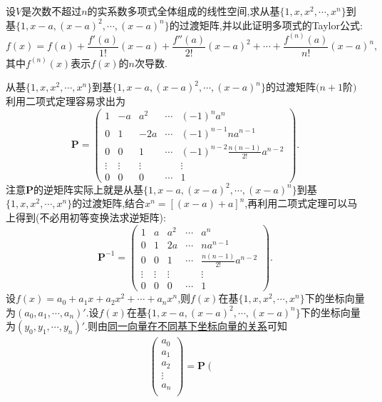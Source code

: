 \documentclass[lang=cn,newtx,10pt,scheme=chinese]{elegantbook}
\begin{document}
\begin{example}
设\(V\)是次数不超过\(n\)的实系数多项式全体组成的线性空间,求从基\(\{1,x,x^2,\cdots,x^n\}\)到基\(\{1,x - a,(x - a)^2,\cdots,(x - a)^n\}\)的过渡矩阵,并以此证明多项式的Taylor公式:
    \[
    f(x)=f(a)+\frac{f'(a)}{1!}(x - a)+\frac{f''(a)}{2!}(x - a)^2+\cdots+\frac{f^{(n)}(a)}{n!}(x - a)^n,
    \]
    其中\(f^{(n)}(x)\)表示\(f(x)\)的\(n\)次导数.
\end{example}
\begin{solution}
    从基\(\{1,x,x^2,\cdots,x^n\}\)到基\(\{1,x - a,(x - a)^2,\cdots,(x - a)^n\}\)的过渡矩阵\((n + 1\)阶\()\)利用二项式定理容易求出为
    \[
    \boldsymbol{P}=\begin{pmatrix}
    1&-a&a^2&\cdots&(-1)^na^n\\
    0&1&-2a&\cdots&(-1)^{n - 1}na^{n - 1}\\
    0&0&1&\cdots&(-1)^{n - 2}\frac{n(n - 1)}{2!}a^{n - 2}\\
    \vdots&\vdots&\vdots&&\vdots\\
    0&0&0&\cdots&1
    \end{pmatrix}.
    \]
    注意\(\boldsymbol{P}\)的逆矩阵实际上就是从基\(\{1,x - a,(x - a)^2,\cdots,(x - a)^n\}\)到基\(\{1,x,x^2,\cdots,x^n\}\)的过渡矩阵,结合$x^n=[(x-a)+a]^n$,再利用二项式定理可以马上得到(不必用初等变换法求逆矩阵):
    \[
    \boldsymbol{P}^{-1}=\begin{pmatrix}
    1&a&a^2&\cdots&a^n\\
    0&1&2a&\cdots&na^{n - 1}\\
    0&0&1&\cdots&\frac{n(n - 1)}{2!}a^{n - 2}\\
    \vdots&\vdots&\vdots&&\vdots\\
    0&0&0&\cdots&1
    \end{pmatrix}.
    \]
    设\(f(x)=a_0 + a_1x + a_2x^2+\cdots + a_nx^n\),则\(f(x)\)在基\(\{1,x ,x^2,\cdots,x^n\}\)下的坐标向量为$(a_0,a_1,\cdots,a_n)'$.设\(f(x)\)在基\(\{1,x - a,(x - a)^2,\cdots,(x - a)^n\}\)下的坐标向量为$(y_0,y_1,\cdots,y_n)'$.则由\hyperref[theorem:同一向量在不同基下坐标向量的关系]{同一向量在不同基下坐标向量的关系}可知
    \begin{align*}
        \left( \begin{array}{c}
            a_0\\
            a_1\\
            a_2\\
            \vdots\\
            a_n\\
        \end{array} \right) =\boldsymbol{P}\left( \begin{array}{c}

\end{array}
\end{align*}
\end{solution}
\end{document}
